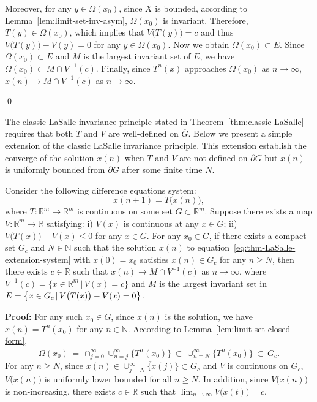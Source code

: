 \documentclass[10pt]{svmult}
\newcommand{\QED}{\begin{flushright}\qed \end{flushright}}
\begin{document}
Moreover, for any $y\in \Omega(x_0)$, since $X$ is bounded, according to Lemma~\ref{lem:limit-set-inv-asym}, $\Omega(x_0)$ is invariant. Therefore, $T(y)\in \Omega(x_0)$, which implies that $V\big( T(y) \big)=c$ and thus $V\big( T(y) \big)-V(y)=0$ for any $y\in \Omega(x_0)$. Now we obtain $\Omega(x_0)\subset E$. Since $\Omega(x_0)\subset E$ and $M$ is the largest invariant set of $E$, we have $\Omega(x_0)\subset M\cap V^{-1}(c)$. Finally, since $T^n(x)$ approaches $\Omega(x_0)$ as $n\to \infty$, $x(n)\to M\cap V^{-1}(c)$ as $n\to \infty$. \QED


The classic LaSalle invariance principle stated in Theorem~\ref{thm:classic-LaSalle} requires that both $T$ and $V$ are well-defined on $\overline{G}$. Below we present a simple extension of the classic LaSalle invariance principle. This extension establish the converge of the solution $x(n)$ when $T$ and $V$ are not defined on $\partial G$ but $x(n)$ is uniformly bounded from $\partial G$ after some finite time $N$.

\begin{theorem}\label{thm:LaSalle-extension}
Consider the following difference equations system:
\begin{equation}\label{eq:thm-LaSalle-extension-system}
x(n+1) = T\big( x(n) \big),
\end{equation}
where $T:\mathbb{R}^m \to \mathbb{R}^m$ is continuous on some set $G\subset \mathbb{R}^m$. Suppose there exists a map $V:\mathbb{R}^m \to \mathbb{R}$ satisfying: i) $V(x)$ is continuous at any $x\in G$; ii) $V\big( T(x) \big)-V(x)\le 0$ for any $x\in G$. For any $x_0\in G$, if there exists a compact set $G_c$ and $N\in \mathbb{N}$ such that the solution $x(n)$ to equation~\eqref{eq:thm-LaSalle-extension-system} with $x(0)=x_0$ satisfies $x(n)\in G_c$ for any $n\ge N$, then there exists $c\in \mathbb{R}$ such that $x(n)\to M\cap V^{-1}(c)$ as $n\to \infty$, where $V^{-1}(c) = \{x\in \mathbb{R}^m\,|\,V(x)=c\}$ and $M$ is the largest invariant set in $E=\big{\{}x\in G_c\,|\,V\big( T(x) \big)-V(x)=0\big{\}}$.  
\end{theorem}

\textbf{Proof:} For any such $x_0\in G$, since $x(n)$ is the solution, we have $x(n)=T^n(x_0)$ for any $n\in \mathbb{N}$. According to Lemma~\ref{lem:limit-set-closed-form}, 
\begin{equation*}
\Omega(x_0) \,=\, \cap_{j=0}^{\infty} \overline{\cup_{n=j}^{\infty}\{T^n( x_0 )\}}\,\subset\,\overline{\cup_{n=N}^{\infty}\{T^{n}( x_0 )\}}\,\subset \, G_c.
\end{equation*}
For any $n\ge N$, since $x(n)\in \overline{\cup_{j=N}^{\infty}\{x(j)\}}\subset G_c$ and $V$ is continuous on $G_c$, $V\big( x(n) \big)$ is uniformly lower bounded for all $n\ge N$. In addition, since $V\big( x(n) \big)$ is non-increasing, there exists $c\in \mathbb{R}$ such that $\lim_{n\to \infty}V\big( x(t) \big)=c$. 
\end{document}
